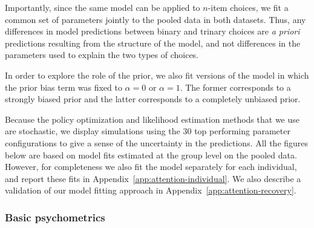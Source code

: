 Importantly, since the same model can be applied to $n$-item choices, we fit a common set of parameters jointly to the pooled data in both datasets. Thus, any differences in model predictions between binary and trinary choices are \emph{a priori} predictions resulting from the structure of the model, and not differences in the parameters used to explain the two types of choices. 

In order to explore the role of the prior, we also fit versions of the model in which the prior bias term was fixed to $\alpha = 0$ or $\alpha = 1$. The former corresponds to a strongly biased prior and the latter corresponds to a completely unbiased prior. 

Because the policy optimization and likelihood estimation methods that we use are stochastic, we display simulations using the $30$ top performing parameter configurations to give a sense of the uncertainty in the predictions. All the figures below are based on model fits estimated at the group level on the pooled data. However, for completeness we also fit the model separately for each individual, and report these fits in Appendix~\ref{app:attention-individual}. We also describe a validation of our model fitting approach in Appendix~\ref{app:attention-recovery}.


\subsubsection{Basic psychometrics}


